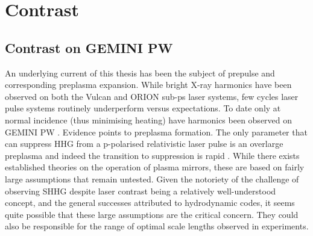 \section{Contrast}\label{sec:ch4-contrast}
\subsection{Contrast on GEMINI PW}

An underlying current of this thesis has been the subject of prepulse and corresponding preplasma expansion. While bright X-ray harmonics have been observed on both the Vulcan \cite{dromeyBrightMultikeVHarmonic2007} and ORION sub-ps laser systems, few cycles laser pulse systems routinely underperform versus expectations. To date only at normal incidence (thus minimising heating) have harmonics been observed on GEMINI PW \cite{dromeyCoherentSynchrotronEmission2013}. Evidence points to preplasma formation. The only parameter that can suppress HHG from a p-polarised relativistic laser pulse is an overlarge preplasma \cite{dollarScalingHighorderHarmonic2013} and indeed the transition to suppression is rapid \cite{kahalyDirectObservationDensityGradient2013}. While there exists established theories on the operation of plasma mirrors, these are based on fairly large assumptions that remain untested. Given the notoriety of the challenge of observing SHHG despite laser contrast being a relatively well-understood concept, and the general successes attributed to hydrodynamic codes, it seems quite possible that these large assumptions are the critical concern. They could also be responsible for the range of optimal scale lengths observed in experiments. 

